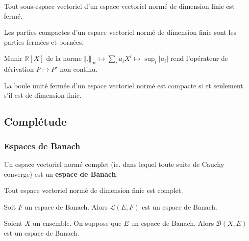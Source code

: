   \begin{corollary}
    Tout sous-espace vectoriel d'un espace vectoriel normé de dimension finie est fermé.
  \end{corollary}

  \begin{corollary}
    Les parties compactes d'un espace vectoriel normé de dimension finie sont les parties fermées et bornées.
  \end{corollary}

  \begin{cexample}
    Munir $\mathbb{R}[X]$ de la norme $\Vert . \Vert_\infty \mapsto \sum_{i} a_i X^i \mapsto \sup_i \vert a_i \vert$ rend l'opérateur de dérivation $P \mapsto P'$ non continu.
  \end{cexample}


  \begin{theorem}
    La boule unité fermée d'un espace vectoriel normé est compacte si et seulement s'il est de dimension finie.
  \end{theorem}

  \subsection{Complétude}

  \subsubsection{Espaces de Banach}


  \begin{definition}
    Un espace vectoriel normé complet (ie. dans lequel toute suite de Cauchy converge) est un \textbf{espace de Banach}.
  \end{definition}


  \begin{example}
    Tout espace vectoriel normé de dimension finie est complet.
  \end{example}

  \begin{example}
    Soit $F$ un espace de Banach. Alors $\mathcal{L}(E,F)$ est un espace de Banach.
  \end{example}


  \begin{example}
    Soient $X$ un ensemble. On suppose que $E$ un espace de Banach. Alors $\mathcal{B}(X,E)$ est un espace de Banach.
  \end{example}

